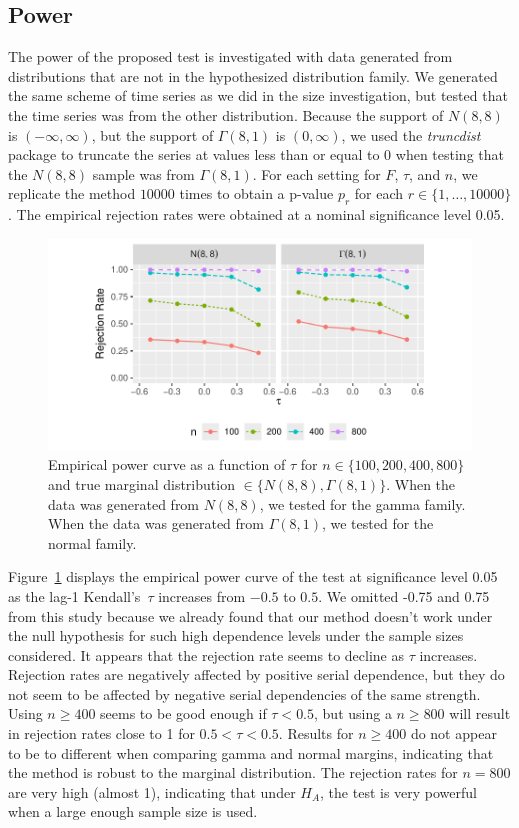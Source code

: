 \documentclass[APA,Times1COL]{WileyNJDv5} %
\begin{document}
\subsection{Power}
The power of the proposed test is investigated with data generated from
distributions that are not in the hypothesized distribution family. 
We generated the same scheme of time series as we did in the size investigation,
but tested that the time series was from the other distribution.
Because the support of $N(8, 8)$ is
$(-\infty, \infty)$, but the support of $\Gamma(8, 1)$ is $(0, \infty)$, we used
the \textsl{truncdist} package \citep{truncdist} to truncate the series at 
values less than or equal to 0 when testing that the $N(8, 8)$ sample was
from $\Gamma(8, 1)$. For each setting for $F$, $\tau$, and $n$, we replicate the 
method $10000$ times 
to obtain a p-value $p_r$ for each $r \in \{1, \ldots, 10000\}$.  
The empirical rejection rates were obtained at a nominal significance level 0.05.


\begin{figure}[tbp]
  \centering
  \includegraphics[scale=1]{figures/rr}
  \caption{Empirical power curve as a function of $\tau$ for
    $n \in \{100, 200, 400, 800\}$ and true marginal distribution 
    $\in \{N(8,8), \Gamma(8,1)\}$. When the data was generated from $N(8,8)$,
    we tested for the gamma family. When the data was generated from 
    $\Gamma(8,1)$, we tested for the normal family. 
  }
  \label{fig:rr}
\end{figure}


Figure~\ref{fig:rr} displays the empirical power curve of the test at
significance level 0.05 as the lag-1 Kendall's~$\tau$ increases from
$-0.5$ to $0.5$. We omitted -0.75 and 0.75 from this study because we already 
found that our method doesn't work under the null hypothesis for such high
dependence levels under the sample sizes considered. It appears that the 
rejection rate seems to decline as $\tau$
increases. Rejection rates are negatively affected by positive serial 
dependence, but they do not seem to be affected by negative serial dependencies
of the same strength.
Using $n \geq 400$ seems to be good enough
if $\tau < 0.5$, but using a $n \geq 800$ will result in 
rejection rates close to 1 for $0.5 < \tau < 0.5$.
Results for $n \geq 400$
do not appear to be to different when comparing gamma and normal 
margins, indicating that the method is robust to the marginal distribution.
The rejection rates for $n = 800$ are very 
high (almost 1), indicating that under $H_A$, the test is very powerful 
when a large enough sample size is used.
\end{document}
